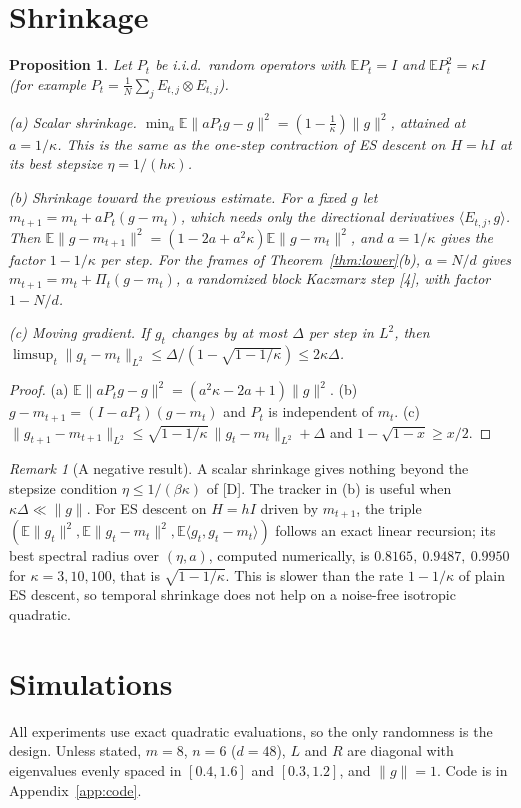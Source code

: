 \documentclass[11pt]{article}
\newtheorem{proposition}[theorem]{Proposition}
\theoremstyle{remark}
\newtheorem{remark}[theorem]{Remark}
\newcommand{\E}{\mathbb{E}}
\newcommand{\ip}[2]{\langle #1,#2\rangle}
\begin{document}
\section{Shrinkage}
\begin{proposition}\label{prop:shrink}
Let $P_t$ be i.i.d.\ random operators with $\E P_t=I$ and $\E P_t^2=\kappa I$ (for example $P_t=\frac1N\sum_jE_{t,j}\otimes E_{t,j}$).

(a) \emph{Scalar shrinkage.} $\min_a\E\|aP_tg-g\|^2=(1-\frac1\kappa)\|g\|^2$, attained at $a=1/\kappa$. This is the same as the one-step contraction of ES descent on $H=hI$ at its best stepsize $\eta=1/(h\kappa)$.

(b) \emph{Shrinkage toward the previous estimate.} For a fixed $g$ let $m_{t+1}=m_t+aP_t(g-m_t)$, which needs only the directional derivatives $\ip{E_{t,j}}{g}$. Then $\E\|g-m_{t+1}\|^2=(1-2a+a^2\kappa)\E\|g-m_t\|^2$, and $a=1/\kappa$ gives the factor $1-1/\kappa$ per step. For the frames of Theorem~\ref{thm:lower}(b), $a=N/d$ gives $m_{t+1}=m_t+\Pi_t(g-m_t)$, a randomized block Kaczmarz step [4], with factor $1-N/d$.

(c) \emph{Moving gradient.} If $g_t$ changes by at most $\Delta$ per step in $L^2$, then $\limsup_t\|g_t-m_t\|_{L^2}\le\Delta/(1-\sqrt{1-1/\kappa})\le2\kappa\Delta$.
\end{proposition}
\begin{proof}
(a) $\E\|aP_tg-g\|^2=(a^2\kappa-2a+1)\|g\|^2$. (b) $g-m_{t+1}=(I-aP_t)(g-m_t)$ and $P_t$ is independent of $m_t$. (c) $\|g_{t+1}-m_{t+1}\|_{L^2}\le\sqrt{1-1/\kappa}\,\|g_t-m_t\|_{L^2}+\Delta$ and $1-\sqrt{1-x}\ge x/2$.
\end{proof}
\begin{remark}[A negative result]
A scalar shrinkage gives nothing beyond the stepsize condition $\eta\le1/(\beta\kappa)$ of [D]. The tracker in (b) is useful when $\kappa\Delta\ll\|g\|$. For ES descent on $H=hI$ driven by $m_{t+1}$, the triple $(\E\|g_t\|^2,\E\|g_t-m_t\|^2,\E\ip{g_t}{g_t-m_t})$ follows an exact linear recursion; its best spectral radius over $(\eta,a)$, computed numerically, is $0.8165,\ 0.9487,\ 0.9950$ for $\kappa=3,10,100$, that is $\sqrt{1-1/\kappa}$. This is slower than the rate $1-1/\kappa$ of plain ES descent, so temporal shrinkage does not help on a noise-free isotropic quadratic.
\end{remark}

\section{Simulations}\label{sec:sim}
All experiments use exact quadratic evaluations, so the only randomness is the design. Unless stated, $m=8$, $n=6$ ($d=48$), $L$ and $R$ are diagonal with eigenvalues evenly spaced in $[0.4,1.6]$ and $[0.3,1.2]$, and $\|g\|=1$. Code is in Appendix~\ref{app:code}.
\end{document}
